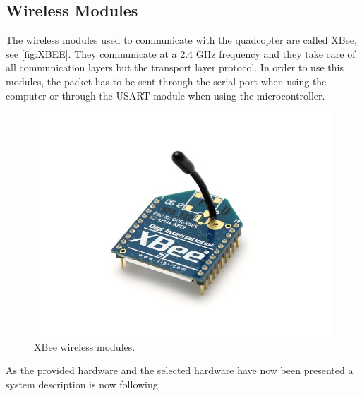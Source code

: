 \subsection{Wireless Modules}

The wireless modules used to communicate with the quadcopter are called XBee, see \autoref{fig:XBEE}. They communicate at a 2.4 GHz frequency and they take care of all communication layers but the transport layer protocol. In order to use this modules, the packet has to be sent through the serial port when using the computer or through the USART module when using the microcontroller.  
\begin{figure}[H]
	\centering
	\includegraphics[scale=0.4]{figures/XBEE}
	\caption{XBee wireless modules.}
	\label{fig:XBEE}
\end{figure}

As the provided hardware and the selected hardware have now been presented a system description is now following. 